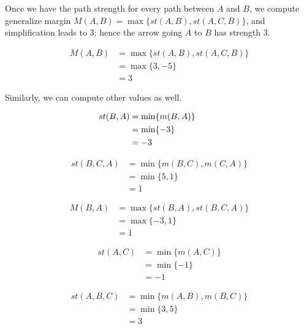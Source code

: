 Once we have the path strength for every path between $A$ and $B$, we compute generalize margin 
$M(A, B) = \max \lbrace st (A, B), st(A, C, B) \rbrace$, and simplification leads to 3; hence the arrow going
$A$ to $B$ has strength 3.  


\begin{align}
M (A, B)&=  \max \lbrace st (A, B), st(A, C, B) \rbrace \nonumber \\
                     &= \max \lbrace 3, -5 \rbrace \nonumber \\
                     &= 3\nonumber
\end{align}

Similarly, we can compute other values as well. 

\begin{align}
\hspace*{-10mm} st (B, A)&=  \min \lbrace m (B, A) \rbrace  \nonumber \\
					  &= \min \lbrace -3 \rbrace  \nonumber \\
                     &= -3 \nonumber
\end{align}


\begin{align}
st (B, C, A)&=  \min \lbrace m (B, C), m (C, A) \rbrace  \nonumber \\
                     &= \min \lbrace 5, 1 \rbrace \nonumber \\
                     &= 1\nonumber
\end{align}

\begin{align}
M (B, A)&=  \max \lbrace st (B, A), st(B, C, A) \rbrace \nonumber \\
                     &= \max \lbrace -3, 1 \rbrace \nonumber \\
                     &= 1\nonumber
\end{align}

\begin{align}
st (A, C)&=  \min \lbrace m (A, C) \rbrace  \nonumber \\
					  &= \min \lbrace -1 \rbrace  \nonumber \\
                     &= -1 \nonumber
\end{align}


\begin{align}
st (A, B, C)&= \min \lbrace m (A, B), m (B, C) \rbrace  \nonumber \\
                     &= \min \lbrace 3, 5 \rbrace \nonumber \\
                     &= 3\nonumber
\end{align}

